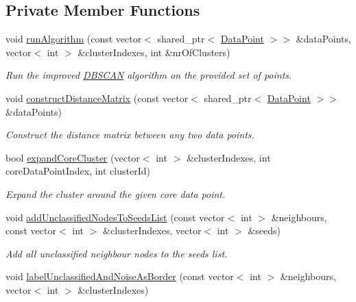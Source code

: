\subsection*{Private Member Functions}
\begin{DoxyCompactItemize}
\item 
void \hyperlink{classmultiscale_1_1analysis_1_1DBSCAN_aceb5dd9fe24a24cbf09ddc9082dc1f82}{run\-Algorithm} (const vector$<$ shared\-\_\-ptr$<$ \hyperlink{classmultiscale_1_1analysis_1_1DataPoint}{Data\-Point} $>$$>$ \&data\-Points, vector$<$ int $>$ \&cluster\-Indexes, int \&nr\-Of\-Clusters)
\begin{DoxyCompactList}\small\item\em Run the improved \hyperlink{classmultiscale_1_1analysis_1_1DBSCAN}{D\-B\-S\-C\-A\-N} algorithm on the provided set of points. \end{DoxyCompactList}\item 
void \hyperlink{classmultiscale_1_1analysis_1_1DBSCAN_a4770eddfc02c41deb114e5d42affd93a}{construct\-Distance\-Matrix} (const vector$<$ shared\-\_\-ptr$<$ \hyperlink{classmultiscale_1_1analysis_1_1DataPoint}{Data\-Point} $>$$>$ \&data\-Points)
\begin{DoxyCompactList}\small\item\em Construct the distance matrix between any two data points. \end{DoxyCompactList}\item 
bool \hyperlink{classmultiscale_1_1analysis_1_1DBSCAN_a400c4e9fb1d9e9bafa970b33912a5ce1}{expand\-Core\-Cluster} (vector$<$ int $>$ \&cluster\-Indexes, int core\-Data\-Point\-Index, int cluster\-Id)
\begin{DoxyCompactList}\small\item\em Expand the cluster around the given core data point. \end{DoxyCompactList}\item 
void \hyperlink{classmultiscale_1_1analysis_1_1DBSCAN_a6ead683810b4f04a48cd0a4d0f5f7a6b}{add\-Unclassified\-Nodes\-To\-Seeds\-List} (const vector$<$ int $>$ \&neighbours, const vector$<$ int $>$ \&cluster\-Indexes, vector$<$ int $>$ \&seeds)
\begin{DoxyCompactList}\small\item\em Add all unclassified neighbour nodes to the seeds list. \end{DoxyCompactList}\item 
void \hyperlink{classmultiscale_1_1analysis_1_1DBSCAN_a5b0d19aab403005cac7fbe0851f5a969}{label\-Unclassified\-And\-Noise\-As\-Border} (const vector$<$ int $>$ \&neighbours, vector$<$ int $>$ \&cluster\-Indexes)

\end{DoxyCompactItemize}
